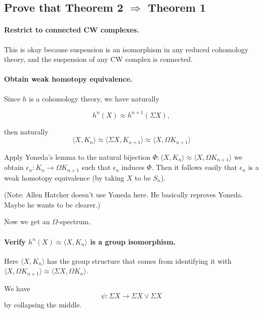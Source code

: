 \documentclass[11pt, oneside]{article}   	%
\theoremstyle{definition}
\begin{document}
\subsection{Prove that Theorem 2 $\Rightarrow$ Theorem 1}

\paragraph{Restrict to connected CW complexes.} This is okay because suspension is an isomorphism in any reduced cohomology theory, and the suspension of any CW complex is connected.

\paragraph{Obtain weak homotopy equivalence.} Since $h$ is a cohomology theory, we have naturally

\begin{equation}
	h^n(X)\approx h^{n+1}(\Sigma X),
\end{equation}

then naturally
\begin{equation}
	\langle X, K_n\rangle\approx\langle \Sigma X, K_{n+1}\rangle\approx\langle X, \Omega K_{n+1}\rangle
\end{equation}

Apply Yoneda's lemma to the natural bijection $\Phi: \langle X, K_n\rangle\approx\langle X, \Omega K_{n+1}\rangle$ we obtain $\epsilon_n:K_n\to \Omega K_{n+1}$ such that $\epsilon_n$
 induces $\Phi$. Then it follows easily that $\epsilon_n$ is a weak homotopy equivalence (by taking $X$ to be $S_n$).

(Note: Allen Hatcher doesn't use Yoneda here. He basically reproves Yoneda. Maybe he wants to be clearer.)

Now we get an $\Omega$-spectrum.

\paragraph{Verify $h^n(X)\approx \langle X, K_n\rangle$ is a group isomorphism.} Here $\langle X, K_n\rangle$ has the group structure that comes from identifying it with $\langle X, \Omega K_{n+1}\rangle\approx \langle \Sigma X, \Omega K_n\rangle$.

We have
\begin{equation}
	\psi:\Sigma X\to\Sigma X\vee \Sigma X
\end{equation}
by collapsing the middle.
\end{document}
